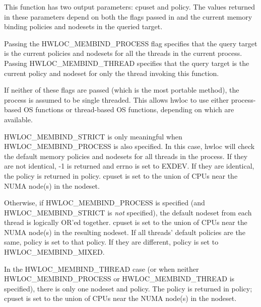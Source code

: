 This function has two output parameters: {\ttfamily cpuset} and {\ttfamily policy}. The values returned in these parameters depend on both the {\ttfamily flags} passed in and the current memory binding policies and nodesets in the queried target.

Passing the HWLOC\_\-MEMBIND\_\-PROCESS flag specifies that the query target is the current policies and nodesets for all the threads in the current process. Passing HWLOC\_\-MEMBIND\_\-THREAD specifies that the query target is the current policy and nodeset for only the thread invoking this function.

If neither of these flags are passed (which is the most portable method), the process is assumed to be single threaded. This allows hwloc to use either process-\/based OS functions or thread-\/based OS functions, depending on which are available.

HWLOC\_\-MEMBIND\_\-STRICT is only meaningful when HWLOC\_\-MEMBIND\_\-PROCESS is also specified. In this case, hwloc will check the default memory policies and nodesets for all threads in the process. If they are not identical, -\/1 is returned and errno is set to EXDEV. If they are identical, the policy is returned in {\ttfamily policy}. {\ttfamily cpuset} is set to the union of CPUs near the NUMA node(s) in the nodeset.

Otherwise, if HWLOC\_\-MEMBIND\_\-PROCESS is specified (and HWLOC\_\-MEMBIND\_\-STRICT is {\itshape not\/} specified), the default nodeset from each thread is logically OR'ed together. {\ttfamily cpuset} is set to the union of CPUs near the NUMA node(s) in the resulting nodeset. If all threads' default policies are the same, {\ttfamily policy} is set to that policy. If they are different, {\ttfamily policy} is set to HWLOC\_\-MEMBIND\_\-MIXED.

In the HWLOC\_\-MEMBIND\_\-THREAD case (or when neither HWLOC\_\-MEMBIND\_\-PROCESS or HWLOC\_\-MEMBIND\_\-THREAD is specified), there is only one nodeset and policy. The policy is returned in {\ttfamily policy}; {\ttfamily cpuset} is set to the union of CPUs near the NUMA node(s) in the {\ttfamily nodeset}.


